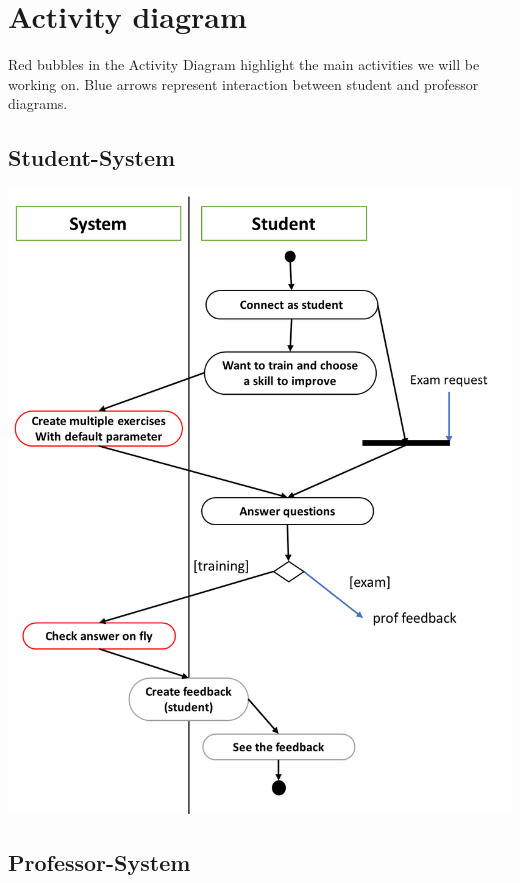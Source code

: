 \documentclass{article}
\begin{document}
\section{Activity diagram}
Red bubbles in the Activity Diagram highlight the main activities we will be working on. Blue arrows represent interaction between student and professor diagrams.
\subsection{Student-System}
\begin{center}
    \includegraphics[height=.8\textheight]{studentAD.png}
\end{center}
\subsection{Professor-System}
\end{document}
